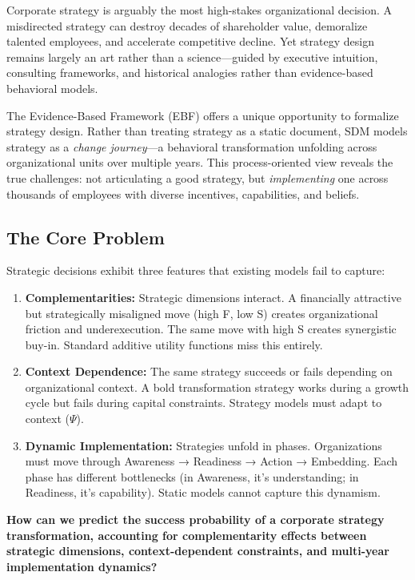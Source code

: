 Corporate strategy is arguably the most high-stakes organizational decision. A misdirected strategy can destroy decades of shareholder value, demoralize talented employees, and accelerate competitive decline. Yet strategy design remains largely an art rather than a science---guided by executive intuition, consulting frameworks, and historical analogies rather than evidence-based behavioral models.

The Evidence-Based Framework (EBF) offers a unique opportunity to formalize strategy design. Rather than treating strategy as a static document, SDM models strategy as a \textit{change journey}---a behavioral transformation unfolding across organizational units over multiple years. This process-oriented view reveals the true challenges: not articulating a good strategy, but \textit{implementing} one across thousands of employees with diverse incentives, capabilities, and beliefs.

\subsection{The Core Problem}

Strategic decisions exhibit three features that existing models fail to capture:

\begin{enumerate}
    \item \textbf{Complementarities:} Strategic dimensions interact. A financially attractive but strategically misaligned move (high F, low S) creates organizational friction and underexecution. The same move with high S creates synergistic buy-in. Standard additive utility functions miss this entirely.

    \item \textbf{Context Dependence:} The same strategy succeeds or fails depending on organizational context. A bold transformation strategy works during a growth cycle but fails during capital constraints. Strategy models must adapt to context ($\Psi$).

    \item \textbf{Dynamic Implementation:} Strategies unfold in phases. Organizations must move through Awareness → Readiness → Action → Embedding. Each phase has different bottlenecks (in Awareness, it's understanding; in Readiness, it's capability). Static models cannot capture this dynamism.
\end{enumerate}

\begin{tcolorbox}[colback=red!5!white, colframe=red!75!black,
    title=The Fundamental Question]
\textbf{How can we predict the success probability of a corporate strategy transformation, accounting for complementarity effects between strategic dimensions, context-dependent constraints, and multi-year implementation dynamics?}
\end{tcolorbox}


